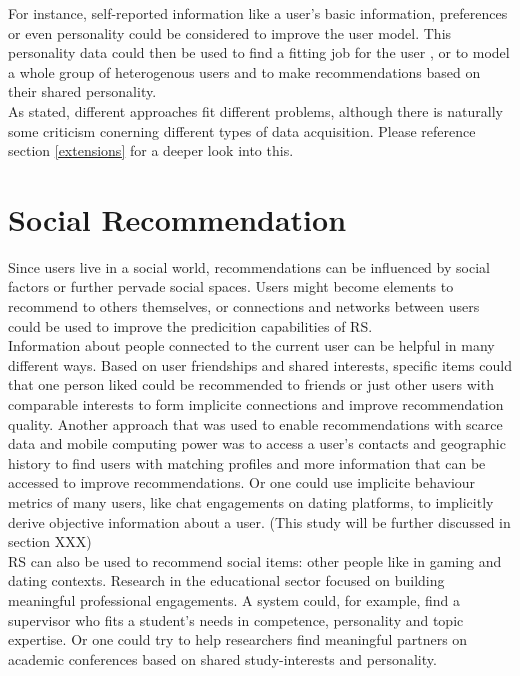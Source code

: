\documentclass[nochapterpage,bigchapter,linedtoc,longdoc,colorback,accentcolor=tud3b]{tudreport}
\begin{document}
For instance, self-reported information like a user's basic information, preferences or even personality could be considered to improve the user model. \cite{nunes2012personality} This personality data could then be used to find a fitting job for the user \cite{costa1995persons}, or to model a whole group of heterogenous users and to make recommendations based on their shared personality. \cite{recio2009personality}\\
As stated, different approaches fit different problems, although there is naturally some criticism conerning different types of data acquisition. Please reference section \ref{extensions} for a deeper look into this.\\

\section{Social Recommendation}
Since users live in a social world, recommendations can be influenced by social factors or further pervade social spaces. Users might become elements to recommend to others themselves, or connections and networks between users could be used to improve the predicition capabilities of RS.\\
Information about people connected to the current user can be helpful in many different ways. Based on user friendships and shared interests, specific items could that one person liked could be recommended to friends \cite{feng2013recommendation} or just other users with comparable interests to form implicite connections and improve recommendation quality. \cite{hsu2018general} Another approach that was used to enable recommendations with scarce data and mobile computing power was to access a user's contacts and geographic history to find users with matching profiles and more information that can be accessed to improve recommendations. \cite{ramaswamy2009caesar} Or one could use implicite behaviour metrics of many users, like chat engagements on dating platforms, to implicitly derive objective information about a user. \cite{xia2015reciprocal} (This study will be further discussed in section XXX)\\
RS can also be used to recommend social items: other people like in gaming and dating contexts. Research in the educational sector focused on building meaningful professional engagements. A system could, for example, find a supervisor who fits a student's needs in competence, personality and topic expertise. \cite{zhang2016personality} Or one could try to help researchers find meaningful partners on academic conferences based on shared study-interests and personality. \cite{asabere2017improving}\\
\end{document}
